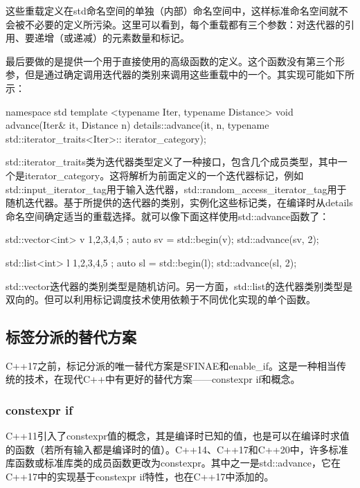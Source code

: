 这些重载定义在std命名空间的单独（内部）命名空间中，这样标准命名空间就不会被不必要的定义所污染。这里可以看到，每个重载都有三个参数：对迭代器的引用、要递增（或递减）的元素数量和标记。

最后要做的是提供一个用于直接使用的高级函数的定义。这个函数没有第三个形参，但是通过确定调用迭代器的类别来调用这些重载中的一个。其实现可能如下所示：

\begin{cpp}
namespace std
{
	template <typename Iter, typename Distance>
	void advance(Iter& it, Distance n)
	{
		details::advance(it, n,
			typename std::iterator_traits<Iter>::
								iterator_category{});
	}
}
\end{cpp}

std::iterator\_traits类为迭代器类型定义了一种接口，包含几个成员类型，其中一个是iterator\_category。这将解析为前面定义的一个迭代器标记，例如std::input\_iterator\_tag用于输入迭代器，std::random\_access\_iterator\_tag用于随机迭代器。基于所提供的迭代器的类别，实例化这些标记类，在编译时从details命名空间确定适当的重载选择。就可以像下面这样使用std::advance函数了：

\begin{cpp}
std::vector<int> v{ 1,2,3,4,5 };
auto sv = std::begin(v);
std::advance(sv, 2);

std::list<int> l{ 1,2,3,4,5 };
auto sl = std::begin(l);
std::advance(sl, 2);
\end{cpp}

std::vector迭代器的类别类型是随机访问。另一方面，std::list的迭代器类别类型是双向的。但可以利用标记调度技术使用依赖于不同优化实现的单个函数。

\subsection{标签分派的替代方案}

C++17之前，标记分派的唯一替代方案是SFINAE和enable\_if。这是一种相当传统的技术，在现代C++中有更好的替代方案——constexpr if和概念。

\subsubsection{constexpr if}

C++11引入了constexpr值的概念，其是编译时已知的值，也是可以在编译时求值的函数（若所有输入都是编译时的值）。C++14、C++17和C++20中，许多标准库函数或标准库类的成员函数更改为constexpr。其中之一是std::advance，它在C++17中的实现基于constexpr if特性，也在C++17中添加的。

